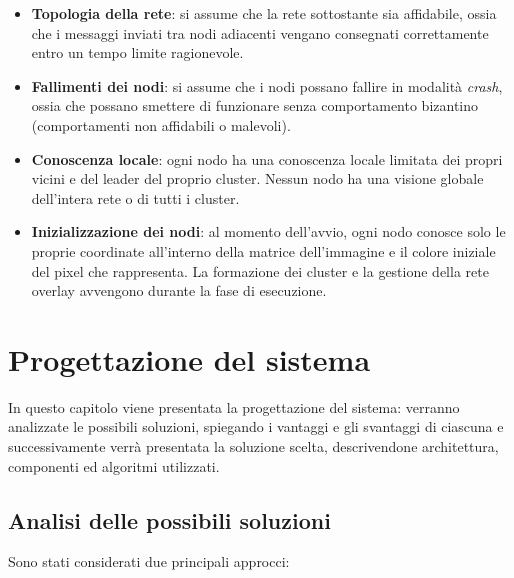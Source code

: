 \documentclass[12pt, a4paper]{report}
\begin{document}
\begin{itemize}
    \item \textbf{Topologia della rete}: si assume che la rete sottostante sia affidabile, ossia che i messaggi inviati tra nodi adiacenti vengano consegnati correttamente entro un tempo limite ragionevole.


    \item \textbf{Fallimenti dei nodi}: si assume che i nodi possano fallire in modalit\`a \emph{crash}, ossia che possano smettere di funzionare senza comportamento bizantino (comportamenti non affidabili o malevoli).

    \item \textbf{Conoscenza locale}: ogni nodo ha una conoscenza locale limitata dei propri vicini e del leader del proprio cluster. Nessun nodo ha una visione globale dell'intera rete o di tutti i cluster.

    \item \textbf{Inizializzazione dei nodi}: al momento dell'avvio, ogni nodo conosce solo le proprie coordinate all'interno della matrice dell'immagine e il colore iniziale del pixel che rappresenta. La formazione dei cluster e la gestione della rete overlay avvengono durante la fase di esecuzione.

\end{itemize}

\chapter{Progettazione del sistema}

In questo capitolo viene presentata la progettazione del sistema: verranno analizzate le possibili soluzioni, spiegando i vantaggi e gli svantaggi di ciascuna e successivamente verr\`a presentata la soluzione scelta, descrivendone architettura, componenti ed algoritmi utilizzati.

\section{Analisi delle possibili soluzioni}

Sono stati considerati due principali approcci:
\end{document}
